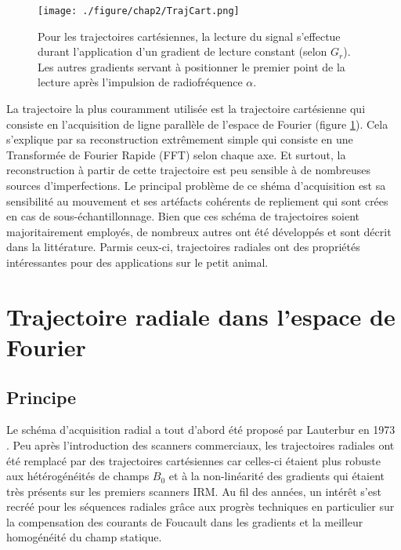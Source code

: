 \begin{figure}[h]
\centering
\texttt{[image: ./figure/chap2/TrajCart.png]}
\caption[Trajectoire cartésienne]{\label{fig:TrajCart} Pour les trajectoires cartésiennes, la lecture du signal s'effectue durant l'application d'un gradient de lecture constant (selon $G_r$). Les autres gradients servant à positionner le premier point de la lecture après l'impulsion de radiofréquence $\alpha$.}
\end{figure}
La trajectoire la plus couramment utilisée est la trajectoire cartésienne qui consiste en l'acquisition de ligne parallèle de l'espace de Fourier (figure \ref{fig:TrajCart}). Cela s'explique par sa reconstruction extrêmement simple qui consiste en une Transformée de Fourier Rapide (FFT) selon chaque axe. Et surtout, la reconstruction à partir de cette trajectoire est peu sensible à de nombreuses sources d'imperfections. Le principal problème de ce shéma d'acquisition est sa sensibilité au mouvement et ses artéfacts cohérents de repliement qui sont crées en cas de sous-échantillonnage.
Bien que ces schéma de trajectoires soient majoritairement employés, de nombreux autres ont été développés et sont décrit dans la littérature. Parmis ceux-ci, trajectoires radiales ont des propriétés intéressantes pour des applications sur le petit animal.


\section{Trajectoire radiale dans l'espace de Fourier}

\subsection{Principe}
Le schéma d'acquisition radial a tout d'abord été proposé par Lauterbur en 1973 \cite{lauterbur1973image}. Peu après l'introduction des scanners commerciaux, les trajectoires radiales ont été remplacé par des trajectoires cartésiennes car celles-ci étaient plus robuste aux hétérogénéités de champs $B_0$ et à la non-linéarité des gradients qui étaient très présents sur les premiers scanners IRM. Au fil des années, un intérêt s'est recréé pour les séquences radiales grâce aux progrès techniques en particulier sur la compensation des courants de Foucault dans les gradients et la meilleur homogénéité du champ statique. 

